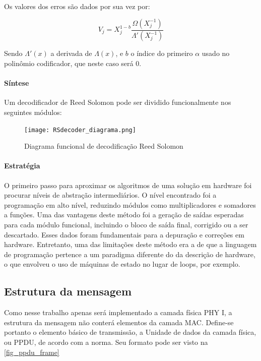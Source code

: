 	Os valores dos erros são dados por sua vez por:
	
	\begin{equation}
	V_{j} = X_{j}^{1-b} \frac{\Omega(X_{j}^{-1})}{\Lambda'(X_{j}^{-1})}
	\end{equation}
	
	Sendo $\Lambda'(x)$ a derivada de $\Lambda(x)$, e $b$ o índice do primeiro $\alpha$ usado no polinômio codificador, que neste caso será 0.
	
	\paragraph{Síntese}
	
	Um decodificador de Reed Solomon pode ser dividido funcionalmente nos seguintes módulos:

	\begin{figure}[!htb]
		\caption{\label{RSDecoder_diagrama_logico} Diagrama funcional de decodificação Reed Solomon}
		\centering
		\texttt{[image: RSdecoder\_diagrama.png]}
	\end{figure}
	
	\paragraph{Estratégia}
	
	O primeiro passo para aproximar os algoritmos de uma solução em hardware foi procurar níveis de abstração intermediários. O nível encontrado foi a programação em alto nível, reduzindo módulos como multiplicadores e somadores a funções. Uma das vantagens deste método foi a geração de saídas esperadas para cada módulo funcional, incluindo o bloco de saída final, corrigido ou a ser descartado. Esses dados foram fundamentais para a depuração e correções em hardware. Entretanto, uma das limitações deste método era a de que a linguagem de programação pertence a um paradigma diferente do da descrição de hardware, o que envolveu o uso de máquinas de estado no lugar de loops, por exemplo.  
	
	\subsection{Estrutura da mensagem}
	
	Como nesse trabalho apenas será implementado a camada física PHY I, a estrutura da mensagem não conterá elementos da camada MAC. Define-se portanto o elemento básico de transmissão, a Unidade de dados da camada física, ou PPDU, de acordo com a norma. Seu formato pode ser visto na \autoref{fig_ppdu_frame}
	
